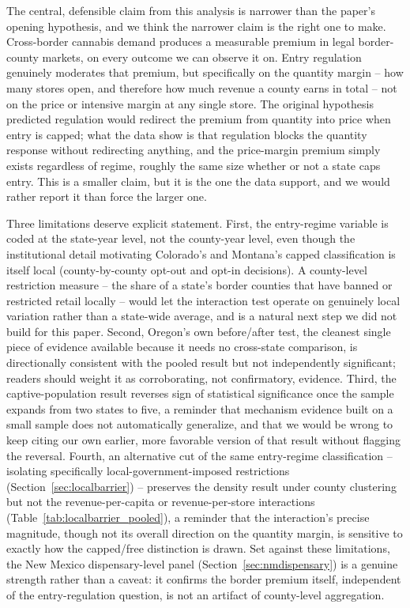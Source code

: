 \documentclass[12pt]{article}
\begin{document}
The central, defensible claim from this analysis is narrower than the paper's opening hypothesis, and we think
the narrower claim is the right one to make. Cross-border cannabis demand produces a measurable premium in
legal border-county markets, on every outcome we can observe it on. Entry regulation genuinely moderates that
premium, but specifically on the quantity margin -- how many stores open, and therefore how much revenue a
county earns in total -- not on the price or intensive margin at any single store. The original hypothesis
predicted regulation would redirect the premium from quantity into price when entry is capped; what the data
show is that regulation blocks the quantity response without redirecting anything, and the price-margin premium
simply exists regardless of regime, roughly the same size whether or not a state caps entry. This is a smaller
claim, but it is the one the data support, and we would rather report it than force the larger one.

Three limitations deserve explicit statement. First, the entry-regime variable is coded at the state-year
level, not the county-year level, even though the institutional detail motivating Colorado's and Montana's
capped classification is itself local (county-by-county opt-out and opt-in decisions). A county-level
restriction measure -- the share of a state's border counties that have banned or restricted retail locally --
would let the interaction test operate on genuinely local variation rather than a state-wide average, and is a
natural next step we did not build for this paper. Second, Oregon's own before/after test, the cleanest single
piece of evidence available because it needs no cross-state comparison, is directionally consistent with the
pooled result but not independently significant; readers should weight it as corroborating, not confirmatory,
evidence. Third, the captive-population result reverses sign of statistical significance once the sample
expands from two states to five, a reminder that mechanism evidence built on a small sample does not
automatically generalize, and that we would be wrong to keep citing our own earlier, more favorable version of
that result without flagging the reversal. Fourth, an alternative cut of the same entry-regime classification
-- isolating specifically local-government-imposed restrictions (Section~\ref{sec:localbarrier}) -- preserves
the density result under county clustering but not the revenue-per-capita or revenue-per-store interactions
(Table~\ref{tab:localbarrier_pooled}), a reminder that the interaction's precise magnitude, though not its
overall direction on the quantity margin, is sensitive to exactly how the capped/free distinction is drawn. Set
against these limitations, the New Mexico dispensary-level panel (Section~\ref{sec:nmdispensary}) is a genuine
strength rather than a caveat: it confirms the border premium itself, independent of the entry-regulation
question, is not an artifact of county-level aggregation.
\end{document}

